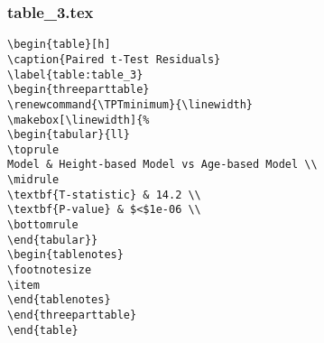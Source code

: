 \documentclass[11pt]{article}
\begin{document}
\subsubsection*{table\_3.tex}

\begin{Verbatim}[tabsize=4]
\begin{table}[h]
\caption{Paired t-Test Residuals}
\label{table:table_3}
\begin{threeparttable}
\renewcommand{\TPTminimum}{\linewidth}
\makebox[\linewidth]{%
\begin{tabular}{ll}
\toprule
Model & Height-based Model vs Age-based Model \\
\midrule
\textbf{T-statistic} & 14.2 \\
\textbf{P-value} & $<$1e-06 \\
\bottomrule
\end{tabular}}
\begin{tablenotes}
\footnotesize
\item
\end{tablenotes}
\end{threeparttable}
\end{table}

\end{Verbatim}
\end{document}
